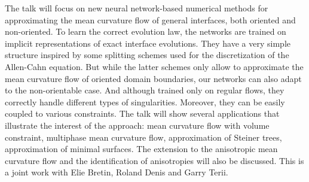 \mypage
{}
\begin{myabstract}
The talk will focus on new neural network-based numerical methods for approximating the mean curvature flow of general interfaces, both oriented and non-oriented. To learn the correct evolution law, the networks are trained on implicit representations of exact interface evolutions. They have a very simple structure inspired by some splitting schemes used for the discretization of the Allen-Cahn equation. But while the latter schemes only allow to approximate the mean curvature flow of oriented domain boundaries, our networks can also adapt to the non-orientable case. And although trained only on regular flows, they correctly handle different types of singularities. Moreover, they can be easily coupled to various constraints. The talk will show several applications that illustrate the interest of the approach: mean curvature flow with volume constraint, multiphase mean curvature flow, approximation of Steiner trees, approximation of minimal surfaces. The extension to the anisotropic mean curvature flow and the identification of anisotropies will also be discussed. This is a joint work with Elie Bretin, Roland Denis and Garry Terii.
\end{myabstract}
